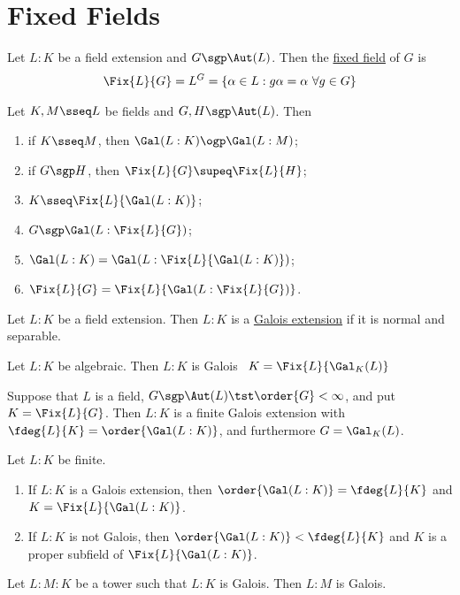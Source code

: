 \documentclass[a4paper]{article}
\begin{document}
\section{Fixed Fields}
\begin{tdefinition}
  Let \( L:K \) be a field extension and \( G\sgp \Aut(L) \). Then the \ul{fixed field} of \( G \) is \begin{align*}
    \Fix{L}{G} = L^G = \{\alpha\in L : g\alpha= \alpha\ \forall g\in G\}
  \end{align*}
\end{tdefinition}

\begin{ttheorem}
  Let \( K,M \sseq L \) be fields and \( G, H \sgp \Aut(L) \).
  Then \begin{enumerate}[label=\arabic*)]
    \item if \( K\sseq M \), then \( \Gal(L:K) \ogp \Gal(L:M) \);
    \item if \( G\sgp H \), then \( \Fix{L}{G} \supeq \Fix{L}{H} \);
    \item \( K\sseq \Fix{L}{\Gal(L:K)} \);
    \item \( G\sgp\Gal(L:\Fix{L}{G}) \);
    \item \( \Gal(L:K) = \Gal(L:\Fix{L}{\Gal(L:K)}) \);
    \item \( \Fix{L}{G} = \Fix{L}{\Gal(L:\Fix{L}{G})} \).
  \end{enumerate}
\end{ttheorem}

\begin{tdefinition}
  Let \( L:K \) be a field extension.
  Then \( L:K \) is a \ul{Galois extension} if it is normal and separable.
\end{tdefinition}

\begin{ttheorem}
  Let \( L:K \) be algebraic.
  Then \( L:K \) is Galois \iff~\( K=\Fix{L}{\Gal_K(L)} \)
\end{ttheorem}

\begin{ttheorem}
  Suppose that \( L \) is a field, \( G\sgp \Aut(L) \tst \order{G}<\infty\), and put \( K=\Fix{L}{G} \).
  Then \( L:K \) is a finite Galois extension with \( \fdeg{L}{K}=\order{\Gal(L:K)} \), and furthermore \( G=\Gal_K(L) \).
\end{ttheorem}

\begin{ttheorem}
  Let \( L:K \) be finite.
  \begin{enumerate}
    \item If \( L:K \) is a Galois extension, then \( \order{\Gal(L:K)}=\fdeg{L}{K} \) and \( K=\Fix{L}{\Gal(L:K)} \).
    \item If \( L:K \) is not Galois, then \( \order{\Gal(L:K)}<\fdeg{L}{K} \) and \( K \) is a proper subfield of \( \Fix{L}{\Gal(L:K)} \).
  \end{enumerate}
\end{ttheorem}

\begin{tcorollary}
  Let \( L:M:K \) be a tower such that \( L:K \) is Galois.
  Then \( L:M \) is Galois.
\end{tcorollary}

\end{document}
